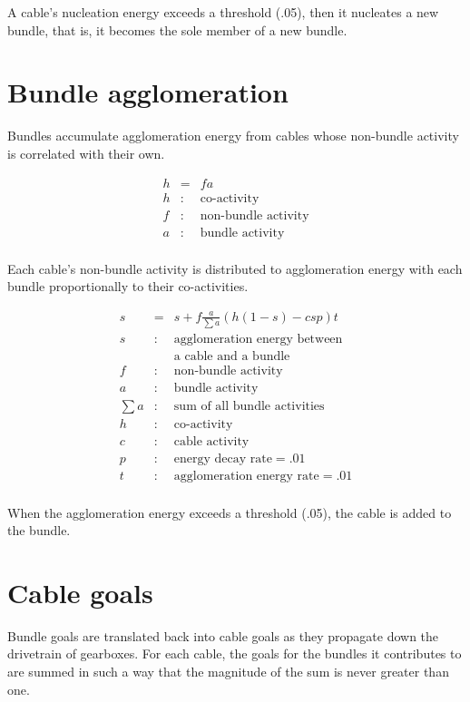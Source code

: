 \documentclass[oneside,twocolumn]{article}
\begin{document}
A cable's nucleation energy exceeds a threshold (.05),  then it nucleates a new bundle, that is, it becomes the sole member of a new bundle.
          
\section*{\color{copper} Bundle agglomeration}

Bundles accumulate agglomeration energy from cables whose non-bundle activity is correlated with their own. 

\begin{eqnarray*}
h &=& fa\\ 
h &:& \mbox{co-activity}\\
f &:& \mbox{non-bundle activity}\\
a &:& \mbox{bundle activity}\\
\end{eqnarray*}

Each cable's non-bundle activity is distributed to agglomeration energy with each bundle proportionally to their co-activities.

\begin{eqnarray*}
s &=& s + f  \frac{a}{\sum a} (h (1-s) - c s p) t\\ 
s &:& \mbox{agglomeration energy between}\\
&& \mbox{a cable and a bundle}\\
f &:& \mbox{non-bundle activity}\\
a &:& \mbox{bundle activity}\\
\sum a &:& \mbox{sum of all bundle activities}\\
h &:& \mbox{co-activity}\\
c &:& \mbox{cable activity}\\
p &:& \mbox{energy decay rate} = .01\\
t &:& \mbox{agglomeration energy rate} = .01\\
\end{eqnarray*}
                                      
When the agglomeration energy exceeds a threshold (.05), the cable is added to the bundle.

\section*{\color{copper} Cable goals}
        
Bundle goals are translated back into cable goals as they propagate down the drivetrain of gearboxes. For each cable, the goals for the bundles it contributes to are summed in such a way that the magnitude of the sum is never greater than one.
\end{document}
